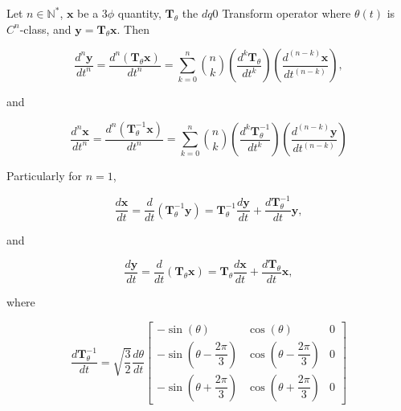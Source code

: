\begin{lemma}\label{theo:dq0_3p_diff}%
Let $n\in\mathbb{N}^*$, $\mathbf{x}$ be a 3$\phi$ quantity, $\mathbf{T}_\theta$ the $dq0$ Transform operator where $\theta(t)$ is $C^n$-class, and $\mathbf{y} = \mathbf{T}_\theta\mathbf{x}$. Then

\begin{equation} \dfrac{d^n \mathbf{y}}{dt^n} = \dfrac{d^n\left(\mathbf{T}_\theta \mathbf{x}\right)}{dt^n} = \sum\limits_{k=0}^{n} {n\choose k} \left(\dfrac{d^{k} \mathbf{T}_\theta}{dt^k}\right) \left(\dfrac{d^{\left(n-k\right)} \mathbf{x}}{dt^{\left(n-k\right)}}\right), \end{equation}

	and

\begin{equation} \dfrac{d^n\mathbf{x}}{dt^n} = \dfrac{d^n\left(\mathbf{T}^{-1}_\theta \mathbf{x}\right)}{dt^n} = \sum\limits_{k=0}^{n} {n\choose k} \left(\dfrac{d^{k} \mathbf{T}^{-1}_\theta}{dt^k}\right) \left(\dfrac{d^{\left(n-k\right)} \mathbf{y}}{dt^{\left(n-k\right)}}\right) \end{equation}

	Particularly for $n=1$,

\begin{equation} \dfrac{d\mathbf{x}}{dt} = \dfrac{d}{dt} \left(\mathbf{T}^{-1}_\theta \mathbf{y}\right) = \mathbf{T}^{-1}_\theta \dfrac{d\mathbf{y}}{dt} + \dfrac{d\mathbf{T}^{-1}_\theta}{dt} \mathbf{y}, \end{equation}

and

\begin{equation} \dfrac{d\mathbf{y}}{dt} = \dfrac{d}{dt} \left(\mathbf{T}_\theta \mathbf{x}\right) = \mathbf{T}_\theta \dfrac{d\mathbf{x}}{dt} + \dfrac{d\mathbf{T}_\theta}{dt} \mathbf{x}, \end{equation}
 
	where

\begin{equation}
        \dfrac{d\mathbf{T}^{-1}_{\theta} }{dt} =
\sqrt{\dfrac{3}{2}}\dfrac{d\theta}{dt}
\left[\begin{array}{ccc}
         -\sin\left(\theta\right)                    & \cos\left(\theta\right)                    & 0 \\[5mm]
         -\sin\left(\theta - \dfrac{2\pi}{3} \right) & \cos\left(\theta - \dfrac{2\pi}{3} \right) & 0 \\[5mm]
         -\sin\left(\theta + \dfrac{2\pi}{3} \right) & \cos\left(\theta + \dfrac{2\pi}{3} \right) & 0 
\end{array}\right]
\end{equation}


\end{lemma}

